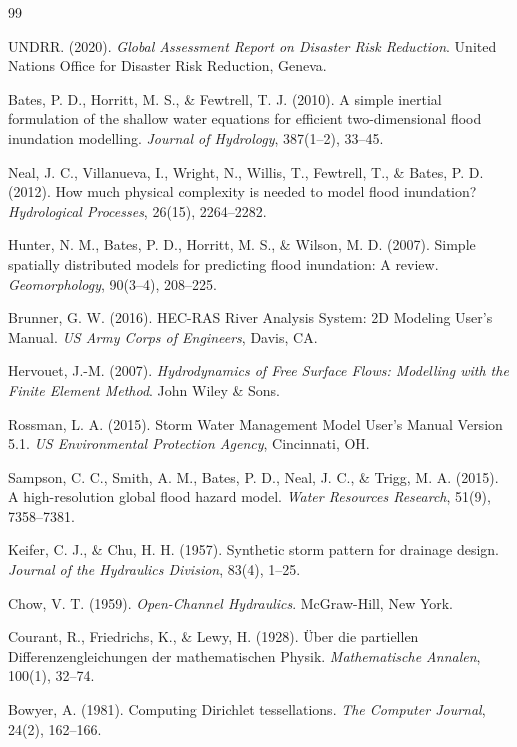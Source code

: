 \documentclass[11pt, a4paper]{article}
\begin{document}
\begin{thebibliography}{99}

 UNDRR. (2020). \textit{Global Assessment Report on Disaster Risk Reduction}. United Nations Office for Disaster Risk Reduction, Geneva.

 Bates, P. D., Horritt, M. S., \& Fewtrell, T. J. (2010). A simple inertial formulation of the shallow water equations for efficient two-dimensional flood inundation modelling. \textit{Journal of Hydrology}, 387(1--2), 33--45.

 Neal, J. C., Villanueva, I., Wright, N., Willis, T., Fewtrell, T., \& Bates, P. D. (2012). How much physical complexity is needed to model flood inundation? \textit{Hydrological Processes}, 26(15), 2264--2282.

 Hunter, N. M., Bates, P. D., Horritt, M. S., \& Wilson, M. D. (2007). Simple spatially distributed models for predicting flood inundation: A review. \textit{Geomorphology}, 90(3--4), 208--225.

 Brunner, G. W. (2016). HEC-RAS River Analysis System: 2D Modeling User's Manual. \textit{US Army Corps of Engineers}, Davis, CA.

 Hervouet, J.-M. (2007). \textit{Hydrodynamics of Free Surface Flows: Modelling with the Finite Element Method}. John Wiley \& Sons.

 Rossman, L. A. (2015). Storm Water Management Model User's Manual Version 5.1. \textit{US Environmental Protection Agency}, Cincinnati, OH.

 Sampson, C. C., Smith, A. M., Bates, P. D., Neal, J. C., \& Trigg, M. A. (2015). A high-resolution global flood hazard model. \textit{Water Resources Research}, 51(9), 7358--7381.

 Keifer, C. J., \& Chu, H. H. (1957). Synthetic storm pattern for drainage design. \textit{Journal of the Hydraulics Division}, 83(4), 1--25.

 Chow, V. T. (1959). \textit{Open-Channel Hydraulics}. McGraw-Hill, New York.

 Courant, R., Friedrichs, K., \& Lewy, H. (1928). \"Uber die partiellen Differenzengleichungen der mathematischen Physik. \textit{Mathematische Annalen}, 100(1), 32--74.

 Bowyer, A. (1981). Computing Dirichlet tessellations. \textit{The Computer Journal}, 24(2), 162--166.


\end{thebibliography}
\end{document}
